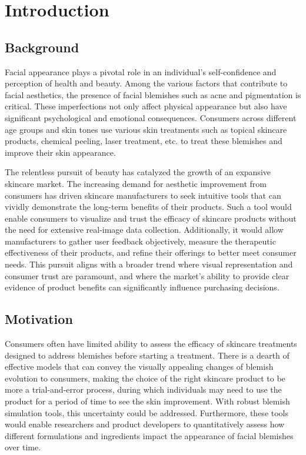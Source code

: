 
\chapter{Introduction}
\begin{spacing}{1.5}
\setlength{\parskip}{0.3in}

\section{Background}

Facial appearance plays a pivotal role in an individual's self-confidence and perception of health and beauty. Among the various factors that contribute to facial aesthetics, the presence of facial blemishes such as acne and pigmentation is critical. These imperfections not only affect physical appearance but also have significant psychological and emotional consequences. Consumers across different age groups and skin tones use various skin treatments such as topical skincare products, chemical peeling, laser treatment, etc. to treat these blemishes and improve their skin appearance\cite{doi:10.2352/EI.2023.35.7.IMAGE-276}.

The relentless pursuit of beauty has catalyzed the growth of an expansive skincare market. The increasing demand for aesthetic improvement from consumers has driven skincare manufacturers to seek intuitive tools that can vividly demonstrate the long-term benefits of their products. Such a tool would enable consumers to visualize and trust the efficacy of skincare products without the need for extensive real-image data collection. Additionally, it would allow manufacturers to gather user feedback objectively, measure the therapeutic effectiveness of their products, and refine their offerings to better meet consumer needs. This pursuit aligns with a broader trend where visual representation and consumer trust are paramount, and where the market's ability to provide clear evidence of product benefits can significantly influence purchasing decisions.

\section{Motivation}

Consumers often have limited ability to assess the efficacy of skincare treatments designed to address blemishes before starting a treatment\cite{doi:10.2352/EI.2023.35.7.IMAGE-276}. There is a dearth of effective models that can convey the visually appealing changes of blemish evolution to consumers, making the choice of the right skincare product to be more a trial-and-error process, during which individuals may need to use the product for a period of time to see the skin improvement. With robust blemish simulation tools, this uncertainty could be addressed. Furthermore, these tools would enable researchers and product developers to quantitatively assess how different formulations and ingredients impact the appearance of facial blemishes over time.


\end{spacing}
